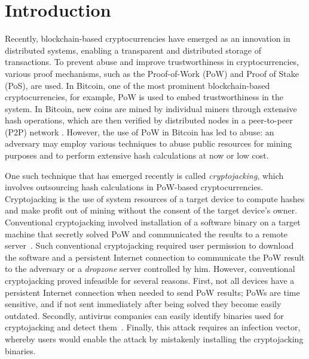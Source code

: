 \documentclass[acmlarge]{acmart}
\newcommand{\bcc}{{blockchain}\xspace}
\newcommand{\cj}{cryptojacking\xspace}
\begin{document}

\maketitle


\section{Introduction}\label{sec:introduction}
Recently, \bcc-based cryptocurrencies have emerged as an innovation in distributed systems, enabling a transparent and distributed storage of transactions. To prevent abuse and improve trustworthiness in cryptocurrencies, various proof mechanisms, such as the Proof-of-Work (PoW) and Proof of Stake (PoS), are used. In Bitcoin, one of the most prominent blockchain-based cryptocurrencies, for example, PoW is used to embed  trustworthiness in the system. In Bitcoin, new coins are mined by individual miners through extensive hash operations, which are then verified by distributed nodes in a peer-to-peer (P2P) network . However, the use of PoW in Bitcoin has led to abuse: an adversary may employ various techniques to abuse public resources for mining purposes and to perform extensive hash calculations at now or low cost. 

One such technique that has emerged recently is called {\em cryptojacking}, which involves outsourcing hash calculations in PoW-based cryptocurrencies. Cryptojacking is the use of system resources of a target device to compute hashes and make profit out of mining without the consent of the target device's owner. Conventional \cj involved installation of a software binary on a target machine that secretly solved PoW and communicated the results to a remote server~\cite{Scott_18}. Such conventional \cj required user permission to download the software and a persistent Internet connection to communicate the PoW result to the adversary or a {\em dropzone} server controlled by him. However, conventional \cj proved infeasible for several reasons. First, not all devices have a persistent Internet connection when needed to send PoW results; PoWs are time sensitive, and if not sent immediately after being solved they become easily outdated. Secondly, antivirus companies can easily identify binaries used for \cj and detect them~\cite{Zuckerman_18}. Finally, this attack requires an infection vector, whereby users would enable the attack by mistakenly installing the \cj binaries. 
\end{document}
